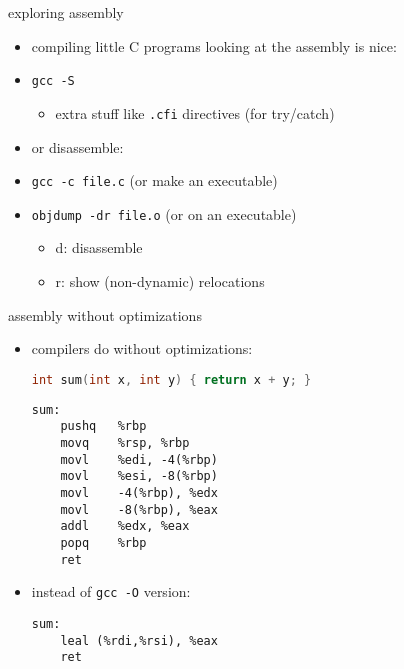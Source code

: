 
\begin{frame}{exploring assembly}
\begin{itemize}
\item compiling little C programs looking at the assembly is nice:
\item {\tt gcc -S }
    \begin{itemize}
    \item extra stuff like {\tt .cfi} directives (for try/catch)
    \end{itemize}
\vspace{.5cm}
\item or disassemble:
\item {\tt gcc  -c file.c} (or make an executable)
\item {\tt objdump -dr file.o} (or on an executable) 
    \begin{itemize}
    \item d: disassemble
    \item r: show (non-dynamic) relocations
    \end{itemize}
\end{itemize}
\end{frame}

\begin{frame}[fragile,label=noOpt]{assembly without optimizations}
\begin{itemize}
\item compilers do  without optimizations:
\begin{lstlisting}[language=C, style=smaller]
int sum(int x, int y) { return x + y; }
\end{lstlisting}
\vspace{-.125cm}
\begin{lstlisting}[language=myasm,style=smaller]
sum:
    pushq   %rbp
    movq    %rsp, %rbp
    movl    %edi, -4(%rbp)
    movl    %esi, -8(%rbp)
    movl    -4(%rbp), %edx
    movl    -8(%rbp), %eax
    addl    %edx, %eax
    popq    %rbp
    ret
\end{lstlisting}
\vspace{-.3cm}
\item instead of {\tt gcc -O} version:
\vspace{-.1cm}
\begin{lstlisting}[language=myasm,style=smaller]
sum:
    leal (%rdi,%rsi), %eax
    ret
\end{lstlisting}
\end{itemize}
\end{frame}


